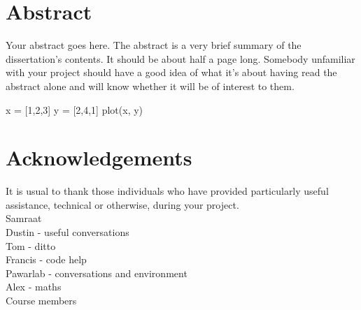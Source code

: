 \documentclass[a4paper]{article} %
\begin{document}
\section*{Abstract}\thispagestyle{empty}
    Your abstract goes here. The abstract is a very brief summary of the dissertation's contents. It should be about half a page long. Somebody unfamiliar with your project should have a good idea of what it's about having read the abstract alone and will know whether it will be of interest to them.

\begin{jlcode}
    x = [1,2,3]
    y = [2,4,1]
    plot(x, y)
\end{jlcode}

\section*{Acknowledgements}\thispagestyle{empty}
    It is usual to thank those individuals who have provided particularly useful assistance, technical or otherwise, during your project. \\
    Samraat \\
    Dustin - useful conversations \\
    Tom - ditto \\
    Francis - code help \\
    Pawarlab - conversations and environment \\
    Alex - maths \\
    Course members \\

\newpage\tableofcontents\thispagestyle{empty}

\newpage\listoffigures\thispagestyle{empty}

\newpage\listoftables\thispagestyle{empty}
\end{document}
